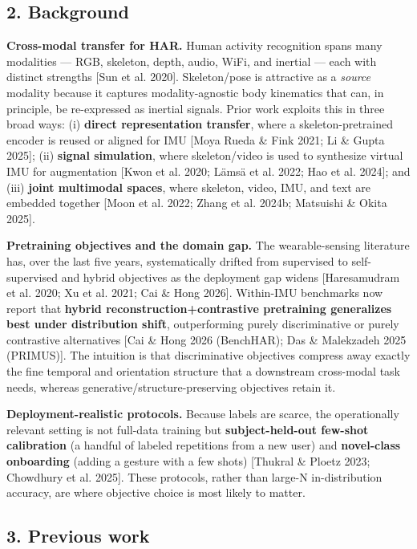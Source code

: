 \subsection{2. Background}

\textbf{Cross-modal transfer for HAR.} Human activity recognition spans many modalities --- RGB, skeleton, depth, audio, WiFi, and inertial --- each with distinct strengths [Sun et al. 2020]. Skeleton/pose is attractive as a \textit{source} modality because it captures modality-agnostic body kinematics that can, in principle, be re-expressed as inertial signals. Prior work exploits this in three broad ways: (i) \textbf{direct representation transfer}, where a skeleton-pretrained encoder is reused or aligned for IMU [Moya Rueda \& Fink 2021; Li \& Gupta 2025]; (ii) \textbf{signal simulation}, where skeleton/video is used to synthesize virtual IMU for augmentation [Kwon et al. 2020; Lämsä et al. 2022; Hao et al. 2024]; and (iii) \textbf{joint multimodal spaces}, where skeleton, video, IMU, and text are embedded together [Moon et al. 2022; Zhang et al. 2024b; Matsuishi \& Okita 2025].

\textbf{Pretraining objectives and the domain gap.} The wearable-sensing literature has, over the last five years, systematically drifted from supervised to self-supervised and hybrid objectives as the deployment gap widens [Haresamudram et al. 2020; Xu et al. 2021; Cai \& Hong 2026]. Within-IMU benchmarks now report that \textbf{hybrid reconstruction+contrastive pretraining generalizes best under distribution shift}, outperforming purely discriminative or purely contrastive alternatives [Cai \& Hong 2026 (BenchHAR); Das \& Malekzadeh 2025 (PRIMUS)]. The intuition is that discriminative objectives compress away exactly the fine temporal and orientation structure that a downstream cross-modal task needs, whereas generative/structure-preserving objectives retain it.

\textbf{Deployment-realistic protocols.} Because labels are scarce, the operationally relevant setting is not full-data training but \textbf{subject-held-out few-shot calibration} (a handful of labeled repetitions from a new user) and \textbf{novel-class onboarding} (adding a gesture with a few shots) [Thukral \& Ploetz 2023; Chowdhury et al. 2025]. These protocols, rather than large-N in-distribution accuracy, are where objective choice is most likely to matter.

\subsection{3. Previous work}


